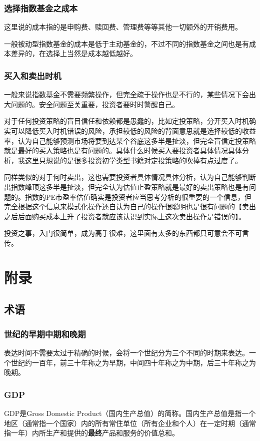 \documentclass[12pt,oneside]{book}
\begin{document}
\section{选择指数基金之成本}
这里说的成本指的是申购费、赎回费、管理费等等其他一切额外的开销费用。

一般被动型指数基金的成本是低于主动基金的，不过不同的指数基金之间也是有成本差异的，在选择上当然是成本越低越好。




\section{买入和卖出时机}
一般来说指数基金不需要频繁操作，但完全疏于操作也是不行的，某些情况下会出大问题的。安全问题至关重要，投资者要时时警醒自己。

对于任何投资策略的盲目信任和依赖都是愚蠢的，比如定投策略，分开买入时机确实可以降低买入时机错误的风险，承担较低的风险的背面意思就是选择较低的收益率，认为自己能够预测市场将要到达某个谷底这多半是扯淡，但完全盲信定投策略就是最好的买入策略也是有问题的。具体什么时候买入要投资者具体情况具体分析，我这里只想说的是很多投资初学类型书籍对定投策略的吹捧有点过度了。

同样类似的对于何时卖出，这也需要投资者具体情况具体分析，认为自己能够判断出指数峰顶这多半是扯淡，但完全认为估值止盈策略就是最好的卖出策略也是有问题的。指数的PE市盈率估值确实是投资者应当思考分析的很重要的一个信息，但完全根据这个信息来模式化操作还自认为自己的操作很聪明也是很有问题的【卖出之后后面购买成本上升了投资者就应该认识到实际上这次卖出操作是错误的】。

投资之事，入门很简单，成为高手很难，这里面有太多的东西都只可意会不可言传。




\appendix
\part{附录}
\chapter{术语}
\section{世纪的早期中期和晚期}
表达时间不需要太过于精确的时候，会将一个世纪分为三个不同的时期来表达。一个世纪约一百年，前三十年称之为早期，中间四十年称之为中期，后三十年称之为晚期。

\section{GDP}
GDP是Gross Domestic Product（国内生产总值）的简称。国内生产总值是指一个地区（通常指一个国家）内的所有常住单位（所有企业和个人）在一定时期（通常指一年）内所生产和提供的\textbf{最终}产品和服务的价值总和。
\end{document}
